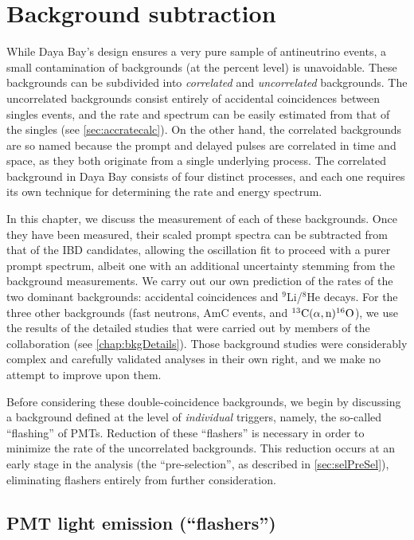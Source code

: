 \documentclass[../thesis.tex]{subfiles}
\begin{document}
\chapter{Background subtraction}
\label{chap:bkg}

While Daya Bay's design ensures a very pure sample of antineutrino events, a small contamination of backgrounds (at the percent level) is unavoidable. These backgrounds can be subdivided into \emph{correlated} and \emph{uncorrelated} backgrounds. The uncorrelated backgrounds consist entirely of accidental coincidences between singles events, and the rate and spectrum can be easily estimated from that of the singles (see \autoref{sec:accratecalc}). On the other hand, the correlated backgrounds are so named because the prompt and delayed pulses are correlated in time and space, as they both originate from a single underlying process. The correlated background in Daya Bay consists of four distinct processes, and each one requires its own technique for determining the rate and energy spectrum.

In this chapter, we discuss the measurement of each of these backgrounds. Once they have been measured, their scaled prompt spectra can be subtracted from that of the IBD candidates, allowing the oscillation fit to proceed with a purer prompt spectrum, albeit one with an additional uncertainty stemming from the background measurements. We carry out our own prediction of the rates of the two dominant backgrounds: accidental coincidences and $^9$Li/$^8$He decays. For the three other backgrounds (fast neutrons, AmC events, and $^{13}\mathrm{C}(\alpha, \mathrm{n})^{16}\mathrm{O}$), we use the results of the detailed studies that were carried out by members of the collaboration (see \autoref{chap:bkgDetails}). Those background studies were considerably complex and carefully validated analyses in their own right, and we make no attempt to improve upon them.

Before considering these double-coincidence backgrounds, we begin by discussing a background defined at the level of \emph{individual} triggers, namely, the so-called ``flashing'' of PMTs. Reduction of these ``flashers'' is necessary in order to minimize the rate of the uncorrelated backgrounds. This reduction occurs at an early stage in the analysis (the ``pre-selection'', as described in \autoref{sec:selPreSel}), eliminating flashers entirely from further consideration.


\section{PMT light emission (``flashers'')}
\label{sec:bkgFlashersOverview}
\end{document}
